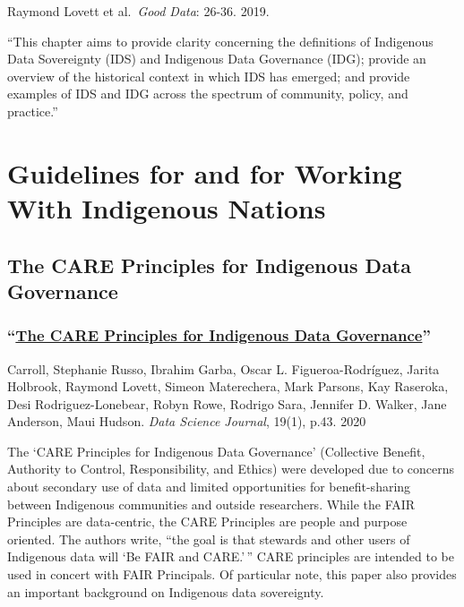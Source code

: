 \documentclass[
]{book}
\begin{document}
Raymond Lovett et al.~\emph{Good Data}: 26-36. 2019.

``This chapter aims to provide clarity concerning the definitions of Indigenous Data Sovereignty (IDS) and Indigenous Data Governance (IDG); provide an overview of the historical context in which IDS has emerged; and provide examples of IDS and IDG across the spectrum of community, policy, and practice.''

\hypertarget{guidelines-for-and-for-working-with-indigenous-nations}{%
\section{Guidelines for and for Working With Indigenous Nations}\label{guidelines-for-and-for-working-with-indigenous-nations}}

\hypertarget{the-care-principles-for-indigenous-data-governance}{%
\subsection{The CARE Principles for Indigenous Data Governance}\label{the-care-principles-for-indigenous-data-governance}}

\hypertarget{the-care-principles-for-indigenous-data-governance-1}{%
\subsubsection*{\texorpdfstring{``\href{http://doi.org/10.5334/dsj-2020-043}{The CARE Principles for Indigenous Data Governance}''}{``The CARE Principles for Indigenous Data Governance''}}\label{the-care-principles-for-indigenous-data-governance-1}}

Carroll, Stephanie Russo, Ibrahim Garba, Oscar L. Figueroa-Rodríguez, Jarita Holbrook, Raymond Lovett, Simeon Materechera, Mark Parsons, Kay Raseroka, Desi Rodriguez-Lonebear, Robyn Rowe, Rodrigo Sara, Jennifer D. Walker, Jane Anderson, Maui Hudson. \emph{Data Science Journal}, 19(1), p.43. 2020

The `CARE Principles for Indigenous Data Governance' (Collective Benefit, Authority to Control, Responsibility, and Ethics) were developed due to concerns about secondary use of data and limited opportunities for benefit-sharing between Indigenous communities and outside researchers. While the FAIR Principles are data-centric, the CARE Principles are people and purpose oriented. The authors write, ``the goal is that stewards and other users of Indigenous data will `Be FAIR and CARE.'\,'' CARE principles are intended to be used in concert with FAIR Principals. Of particular note, this paper also provides an important background on Indigenous data sovereignty.
\end{document}

